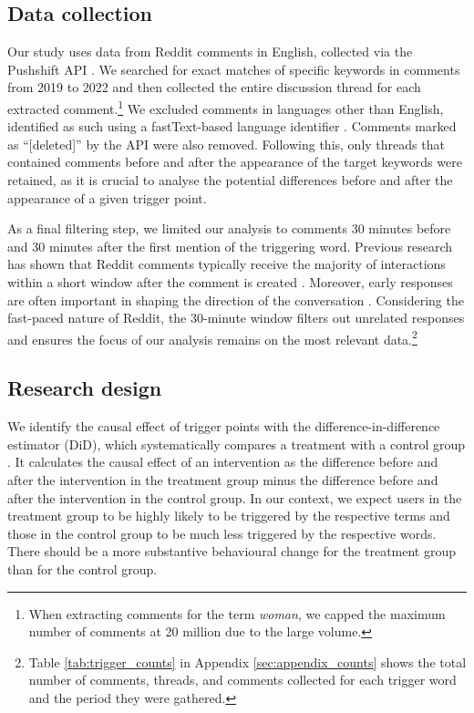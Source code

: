 \subsection{Data collection}
\label{sec:data_collection}
Our study uses data from Reddit comments in English, collected via the Pushshift API \cite{baumgartner2020pushshift}. We searched for exact matches of specific keywords in comments from 2019 to 2022 and then collected the entire discussion thread for each extracted comment.\footnote{When extracting comments for the term \textit{woman}, we capped the maximum number of comments at 20 million due to the large volume.} 
We excluded comments in languages other than English, identified as such using a fastText-based language identifier \cite{bojanowski2017enriching}. Comments marked as ``[deleted]'' by the API were also removed. Following this, only threads that contained comments before and after the appearance of the target keywords were retained, as it is crucial to analyse the potential differences before and after the appearance of a given trigger point. 

As a final filtering step, we limited our analysis to comments 30 minutes before and 30 minutes after the first mention of the triggering word. Previous research has shown that Reddit comments typically receive the majority of interactions within a short window after the comment is created \cite{thukral2018analyzing}. Moreover, early responses are often important in shaping the direction of the conversation \cite{singer2016evidence,horne2017identifying}. Considering the fast-paced nature of Reddit, the 30-minute window filters out unrelated responses and ensures the focus of our analysis remains on the most relevant data.\footnote{Table \ref{tab:trigger_counts} in Appendix \ref{sec:appendix_counts} shows the total number of comments, threads, and comments collected for each trigger word and the period they were gathered.}

\subsection{Research design}
We identify the causal effect of trigger points with the difference-in-difference estimator (DiD), which systematically compares a treatment with a control group \citep{angrist2009mostly, Card1994}. It calculates the causal effect of an intervention as the difference before and after the intervention in the treatment group minus the difference before and after the intervention in the control group. In our context, we expect users in the treatment group to be highly likely to be triggered by the respective terms and those in the control group to be much less triggered by the respective words. There should be a more substantive behavioural change for the treatment group than for the control group. 

